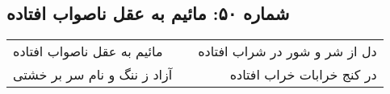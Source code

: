 \begin{center}
\section*{شماره ۵۰: مائیم به عقل ناصواب افتاده}
\label{sec:050}
\begin{longtable}{l p{0.5cm} r}
مائیم به عقل ناصواب افتاده
&&
دل از شر و شور در شراب افتاده
\\
آزاد ز ننگ و نام سر بر خشتی
&&
در کنج خرابات خراب افتاده
\\
\end{longtable}
\end{center}
